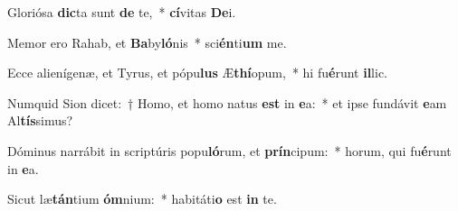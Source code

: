 \item Gloriósa \textbf{dic}ta sunt \textbf{de} te,~* \textbf{cí}vitas \textbf{De}i.
\item Memor ero Rahab, et \textbf{Ba}by\textbf{ló}nis~* sci\textbf{én}ti\textbf{um} me.
\item Ecce alienígenæ, et Tyrus, et pópu\textbf{lus} Æ\textbf{thí}opum,~* hi fu\textbf{é}runt \textbf{il}lic.
\item Numquid Sion dicet:~† Homo, et homo natus \textbf{est} in \textbf{e}a:~* et ipse fundávit \textbf{e}am Al\textbf{tís}simus?
\item Dóminus narrábit in scriptúris popu\textbf{ló}rum, et \textbf{prín}cipum:~* horum, qui fu\textbf{é}runt in \textbf{e}a.
\item Sicut læ\textbf{tán}tium \textbf{óm}nium:~* habitáti\textbf{o} est \textbf{in} te.
